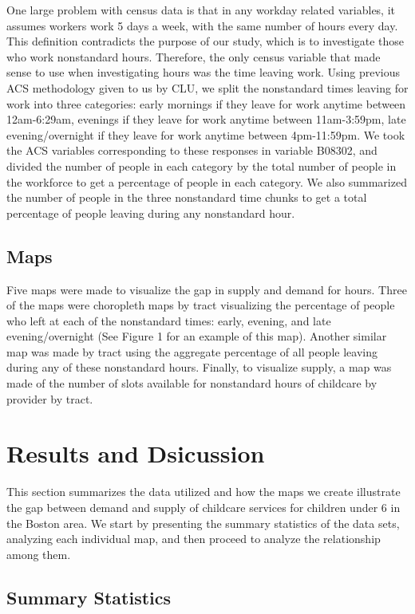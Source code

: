 \documentclass[man]{apa6}
\begin{document}
One large problem with census data is that in any workday related
variables, it assumes workers work 5 days a week, with the same number
of hours every day. This definition contradicts the purpose of our
study, which is to investigate those who work nonstandard hours.
Therefore, the only census variable that made sense to use when
investigating hours was the time leaving work. Using previous ACS
methodology given to us by CLU, we split the nonstandard times leaving
for work into three categories: early mornings if they leave for work
anytime between 12am-6:29am, evenings if they leave for work anytime
between 11am-3:59pm, late evening/overnight if they leave for work
anytime between 4pm-11:59pm. We took the ACS variables corresponding to
these responses in variable B08302, and divided the number of people in
each category by the total number of people in the workforce to get a
percentage of people in each category. We also summarized the number of
people in the three nonstandard time chunks to get a total percentage of
people leaving during any nonstandard hour.

\subsection{Maps}\label{maps-1}

Five maps were made to visualize the gap in supply and demand for hours.
Three of the maps were choropleth maps by tract visualizing the
percentage of people who left at each of the nonstandard times: early,
evening, and late evening/overnight (See Figure 1 for an example of this
map). Another similar map was made by tract using the aggregate
percentage of all people leaving during any of these nonstandard hours.
Finally, to visualize supply, a map was made of the number of slots
available for nonstandard hours of childcare by provider by tract.

\section{Results and Dsicussion}\label{results-and-dsicussion}

This section summarizes the data utilized and how the maps we create
illustrate the gap between demand and supply of childcare services for
children under 6 in the Boston area. We start by presenting the summary
statistics of the data sets, analyzing each individual map, and then
proceed to analyze the relationship among them.

\subsection{Summary Statistics}\label{summary-statistics}
\end{document}
